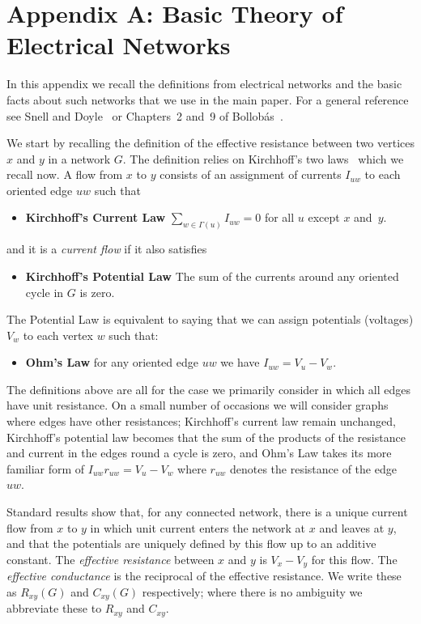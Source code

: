 \documentclass[11pt]{article}
\theoremstyle{remark}
\begin{document}
{}


\section*{Appendix A: Basic Theory of Electrical Networks}\label{s:en} 
In this appendix we recall the definitions from electrical networks
and the basic facts about such networks that we use in the main paper.
For a general reference see Snell and Doyle~\cite{MR920811} or
Chapters~2 and~9 of Bollob\'as~\cite{MR1633290}.

We start by recalling the definition of the effective resistance
between two vertices $x$ and $y$ in a network $G$. The definition
relies on Kirchhoff's two laws~\cite{kirchhoff} which we recall now. A
flow from $x$ to $y$ consists of an assignment of currents $I_{uw}$ to
each oriented edge $uw$ such that
\begin{itemize}
  \item \textbf{Kirchhoff's Current Law} 
  $\sum_{w\in \Gamma(u)}I_{uw}=0$ for all $u$ except $x$ and~$y$.
\end{itemize}
and it is a \emph{current flow} if it also satisfies
\begin{itemize}
  \item \textbf{Kirchhoff's Potential Law} The sum of the currents around any
  oriented cycle in $G$ is zero.
\end{itemize}

The Potential Law is equivalent to saying that we can assign
potentials (voltages) $V_w$ to each vertex $w$ such that:
\begin{itemize}
  \item \textbf{Ohm's Law} for any oriented edge $uw$ we have $I_{uw}=V_u-V_w$.
\end{itemize}
The definitions above are all for the case we primarily consider in
which all edges have unit resistance.  On a small number of occasions
we will consider graphs where edges have other resistances;
Kirchhoff's current law remain unchanged, Kirchhoff's potential law
becomes that the sum of the products of the resistance and current in
the edges round a cycle is zero, and Ohm's Law takes its more familiar
form of $I_{uw}r_{uw}=V_u-V_w$ where $r_{uw}$ denotes the resistance
of the edge $uw$.

Standard results show that, for any connected network, there is a
unique current flow from $x$ to $y$ in which unit current enters the
network at $x$ and leaves at $y$, and that the potentials are uniquely
defined by this flow up to an additive constant.  The \emph{effective
  resistance} between $x$ and $y$ is $V_x-V_y$ for this flow. The
\emph{effective conductance} is the reciprocal of the effective
resistance. We write these as $R_{xy}(G)$ and $C_{xy}(G)$
respectively; where there is no ambiguity we abbreviate these to
$R_{xy}$ and $C_{xy}$.
\end{document}
